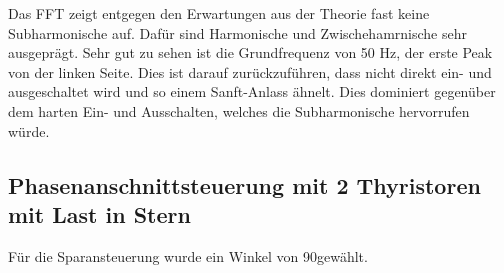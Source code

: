 Das FFT zeigt entgegen den Erwartungen aus der Theorie fast keine Subharmonische auf. Dafür sind Harmonische und Zwischehamrnische sehr ausgeprägt. Sehr gut zu sehen ist die Grundfrequenz von 50 Hz, der erste Peak von der linken Seite. Dies ist darauf zurückzuführen, dass nicht direkt ein- und ausgeschaltet wird und so einem Sanft-Anlass ähnelt. Dies dominiert gegenüber dem harten Ein- und Ausschalten, welches die Subharmonische hervorrufen würde.

\subsection{Phasenanschnittsteuerung mit 2 Thyristoren mit Last in Stern}
Für die Sparansteuerung wurde ein Winkel von 90\textdegree gewählt. 




